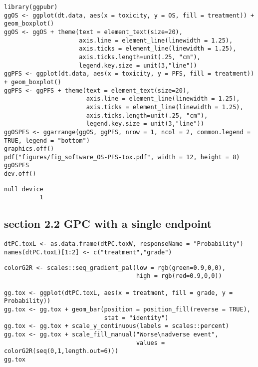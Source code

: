\documentclass[12pt]{article}
\begin{document}
\lstset{language=r,label= ,caption= ,captionpos=b,numbers=none}
\begin{lstlisting}
library(ggpubr)
ggOS <- ggplot(dt.data, aes(x = toxicity, y = OS, fill = treatment)) + geom_boxplot()
ggOS <- ggOS + theme(text = element_text(size=20), 
                     axis.line = element_line(linewidth = 1.25),
                     axis.ticks = element_line(linewidth = 1.25),
                     axis.ticks.length=unit(.25, "cm"),
                     legend.key.size = unit(3,"line"))
ggPFS <- ggplot(dt.data, aes(x = toxicity, y = PFS, fill = treatment)) + geom_boxplot()
ggPFS <- ggPFS + theme(text = element_text(size=20), 
                       axis.line = element_line(linewidth = 1.25),
                       axis.ticks = element_line(linewidth = 1.25),
                       axis.ticks.length=unit(.25, "cm"),
                       legend.key.size = unit(3,"line"))
ggOSPFS <- ggarrange(ggOS, ggPFS, nrow = 1, ncol = 2, common.legend = TRUE, legend = "bottom")
graphics.off()
pdf("figures/fig_software_OS-PFS-tox.pdf", width = 12, height = 8)
ggOSPFS
dev.off()
\end{lstlisting}

\begin{verbatim}
null device 
          1
\end{verbatim}
\subsection{section 2.2 GPC with a single endpoint}
\label{sec:orge5686f4}

\lstset{language=r,label= ,caption= ,captionpos=b,numbers=none}
\begin{lstlisting}
dtPC.toxL <- as.data.frame(dtPC.toxW, responseName = "Probability")
names(dtPC.toxL)[1:2] <- c("treatment","grade")
\end{lstlisting}

\lstset{language=r,label= ,caption= ,captionpos=b,numbers=none}
\begin{lstlisting}
colorG2R <- scales::seq_gradient_pal(low = rgb(green=0.9,0,0),
                                     high = rgb(red=0.9,0,0))

gg.tox <- ggplot(dtPC.toxL, aes(x = treatment, fill = grade, y = Probability))
gg.tox <- gg.tox + geom_bar(position = position_fill(reverse = TRUE),
                            stat = "identity")
gg.tox <- gg.tox + scale_y_continuous(labels = scales::percent)
gg.tox <- gg.tox + scale_fill_manual("Worse\nadverse event",
                                     values = colorG2R(seq(0,1,length.out=6)))
gg.tox 
\end{lstlisting}
\end{document}

